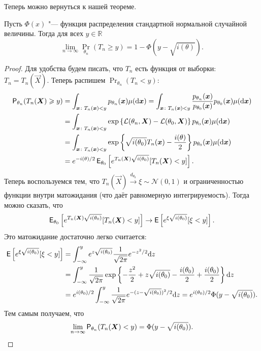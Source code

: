 Теперь можно вернуться к нашей теореме.
\begin{lemma}
    Пусть $\Phi(x)$ "--- функция распределения стандартной нормальной случайной величины. Тогда для всех $y \in \mathbb{R}$
    \[
        \lim\limits_{n \to \infty} \Pr_{\theta_{n}}(T_{n} \geq y) = 1 - \Phi(y - \sqrt{i(\theta)}).
    \]
\end{lemma}
\begin{proof}
    Для удобства будем писать, что $T_{n}$ есть функция от выборки: $T_{n} = T_{n}(\vec{X})$. Теперь распишем $\Pr_{\theta_{n}}(T_{n} < y)$:
    \begin{align*}
        \Pr_{\theta_{n}}(T_{n}(\vec{X}) \geq y)
        &= \int_{\vec{x} \colon T_{n}(\vec{x}) < y} p_{\theta_{n}}(\vec{x})\mu(\dd \vec{x}) = \int_{\vec{x} \colon T_{n}(\vec{x}) < y} \frac{p_{\theta_{n}}(\vec{x})}{p_{\theta_{0}}(\vec{x})} p_{\theta_{0}}(\vec{x}) \mu(\dd \vec{x}) \\
        &= \int_{\vec{x} \colon T_{n}(\vec{x}) < y} \exp\left\{\Ell(\theta_{n}, \vec{X}) - \Ell(\theta_{0}, \vec{X})\right\} p_{\theta_{0}}(\vec{x}) \mu(\dd \vec{x}) \\
        &= \int_{\vec{x} \colon T_{n}(\vec{x}) < y} \exp\left\{\sqrt{i(\theta_{0})}T_{n}(\vec{x}) - \frac{i(\theta)}{2}\right\} p_{\theta_{0}}(\vec{x}) \mu(\dd \vec{x}) \\
        &= e^{-i(\theta)/2}\EE_{\theta_{0}} \left[e^{T_{n}(\vec{X})\sqrt{i(\theta_{0})}}[T_{n}(\vec{X}) < y]\right].
    \end{align*}
    Теперь воспользуемся тем, что $T_{n}(\vec{X}) \xrightarrow{d_{\theta_{0}}} \xi \sim \mathcal{N}(0, 1)$ и ограниченностью функции внутри матожидания (что даёт равномерную интегрируемость). Тогда можно сказать, что
    \[
        \EE_{\theta_{0}} \left[e^{T_{n}(\vec{X})\sqrt{i(\theta_{0})}}[T_{n}(\vec{X}) < y]\right] \to \EE\left[e^{\xi\sqrt{i(\theta_{0})}}[\xi < y]\right].
    \]
    Это матожидание достаточно легко считается:
    \begin{align*}
        \EE\left[e^{\xi\sqrt{i(\theta_{0})}}[\xi < y]\right]
        &= \int_{-\infty}^{y} e^{z\sqrt{i(\theta_{0})}}\frac{1}{\sqrt{2\pi}}e^{-z^{2}/2}\dd z \\
        &= \int_{-\infty}^{y} \frac{1}{\sqrt{2\pi}}\exp\left\{-\frac{z^{2}}{2} + z\sqrt{i(\theta_{0})} - \frac{i(\theta_{0})}{2} + \frac{i(\theta_{0})}{2}\right\}\dd z \\
        &= e^{i(\theta_{0})/2}\int_{-\infty}^{y}\frac{1}{\sqrt{2\pi}}e^{-(z - \sqrt{i(\theta_{0})})^{2}/2}\dd z = e^{i(\theta_{0})/2}\Phi(y - \sqrt{i(\theta_{0})}).
    \end{align*}
    Тем самым получаем, что
    \[
        \lim\limits_{n \to \infty} \Pr_{\theta_{n}}(T_{n}(\vec{X}) < y) = \Phi(y - \sqrt{i(\theta_{0})}). \qedhere
    \]
\end{proof}
